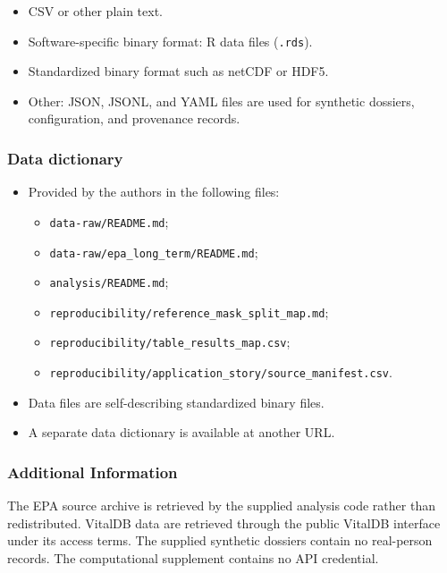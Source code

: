 \documentclass[
  10pt,
]{article}
\providecommand{\tightlist}{%
  \setlength{\itemsep}{0pt}\setlength{\parskip}{0pt}}
\begin{document}
\begin{itemize}
\tightlist
\item[$\boxtimes$]
  CSV or other plain text.
\item[$\boxtimes$]
  Software-specific binary format: R data files (\texttt{.rds}).
\item[$\square$]
  Standardized binary format such as netCDF or HDF5.
\item[$\boxtimes$]
  Other: JSON, JSONL, and YAML files are used for synthetic dossiers,
  configuration, and provenance records.
\end{itemize}

\subsubsection{Data dictionary}\label{data-dictionary}

\begin{itemize}
\item[$\boxtimes$]
  Provided by the authors in the following files:

  \begin{itemize}
  \tightlist
  \item
    \texttt{data-raw/README.md};
  \item
    \texttt{data-raw/epa\_long\_term/README.md};
  \item
    \texttt{analysis/README.md};
  \item
    \texttt{reproducibility/reference\_mask\_split\_map.md};
  \item
    \texttt{reproducibility/table\_results\_map.csv};
  \item
    \texttt{reproducibility/application\_story/source\_manifest.csv}.
  \end{itemize}
\item[$\square$]
  Data files are self-describing standardized binary files.
\item[$\square$]
  A separate data dictionary is available at another URL.
\end{itemize}

\subsubsection{Additional Information}\label{additional-information}

The EPA source archive is retrieved by the supplied analysis code rather
than redistributed. VitalDB data are retrieved through the public
VitalDB interface under its access terms. The supplied synthetic
dossiers contain no real-person records. The computational supplement
contains no API credential.
\end{document}
